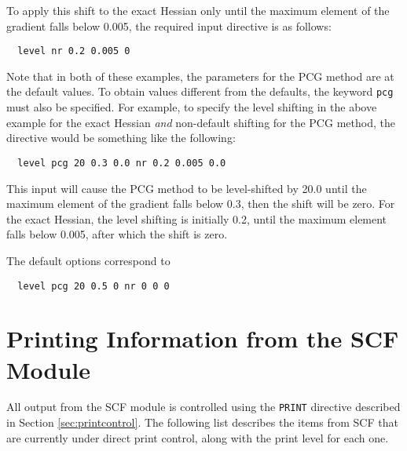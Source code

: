 To apply this shift to the exact Hessian only until the maximum
element of the gradient falls below 0.005, the required input
directive is as follows:
\begin{verbatim}
  level nr 0.2 0.005 0
\end{verbatim}

Note that in both of these examples, the parameters for the PCG method
are at the default values.  To obtain values different from the
defaults, the keyword \verb+pcg+ must also be specified.  For example,
to specify the level shifting in the above example for the exact
Hessian {\em and} non-default shifting for the PCG method, the
directive would be something like the following:
\begin{verbatim}
  level pcg 20 0.3 0.0 nr 0.2 0.005 0.0
\end{verbatim}

This input will cause the PCG method to be level-shifted by 20.0 until
the maximum element of the gradient falls below 0.3, then the shift
will be zero.  For the exact Hessian, the level shifting is initially
0.2, until the maximum element falls below 0.005, after which the
shift is zero. 

The default options correspond to
\begin{verbatim}
  level pcg 20 0.5 0 nr 0 0 0
\end{verbatim}


\section{Printing Information from the SCF Module}
\label{sec:scfprint}

All output from the SCF module is controlled using the \verb+PRINT+
directive described in Section \ref{sec:printcontrol}.  The following 
list describes the items from SCF that are currently under direct 
print control, along with the print level for each one.

